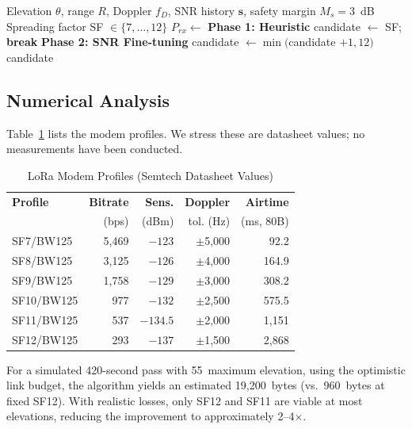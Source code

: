 \documentclass[11pt,a4paper]{article}
\begin{document}
\begin{algorithm}[H]
\caption{Elevation-Aware Rate Adaptation}
\label{alg:amc}
\begin{algorithmic}[1]
\Require Elevation $\theta$, range $R$, Doppler $f_D$, SNR history $\mathbf{s}$, safety margin $M_s = 3$~dB
\Ensure Spreading factor SF $\in \{7, \ldots, 12\}$
\State $P_{rx} \gets$  
\State \textbf{Phase 1: Heuristic}
        \State candidate $\gets$ SF; \textbf{break}
    \EndIf
\EndFor
\State \textbf{Phase 2: SNR Fine-tuning}
    \State candidate $\gets \min($candidate $+ 1, 12)$ 
\EndIf
\State \Return candidate
\end{algorithmic}
\end{algorithm}

\subsection{Numerical Analysis}

Table~\ref{tab:sf_profiles} lists the modem profiles. We stress these are datasheet values; no measurements have been conducted.

\begin{table}[H]
\centering
\caption{LoRa Modem Profiles (Semtech Datasheet Values)}
\begin{tabular}{lrrrr}
\toprule
\textbf{Profile} & \textbf{Bitrate} & \textbf{Sens.} & \textbf{Doppler} & \textbf{Airtime} \\
 & (bps) & (dBm) & tol. (Hz) & (ms, 80B) \\
\midrule
SF7/BW125 & 5,469 & $-123$ & $\pm$5,000 & 92.2 \\
SF8/BW125 & 3,125 & $-126$ & $\pm$4,000 & 164.9 \\
SF9/BW125 & 1,758 & $-129$ & $\pm$3,000 & 308.2 \\
SF10/BW125 & 977 & $-132$ & $\pm$2,500 & 575.5 \\
SF11/BW125 & 537 & $-134.5$ & $\pm$2,000 & 1,151 \\
SF12/BW125 & 293 & $-137$ & $\pm$1,500 & 2,868 \\
\bottomrule
\end{tabular}
\label{tab:sf_profiles}
\end{table}

For a simulated 420-second pass with 55\textdegree\ maximum elevation, using the optimistic link budget, the algorithm yields an estimated 19,200~bytes (vs.\ 960~bytes at fixed SF12). With realistic losses, only SF12 and SF11 are viable at most elevations, reducing the improvement to approximately 2--4$\times$.
\end{document}
